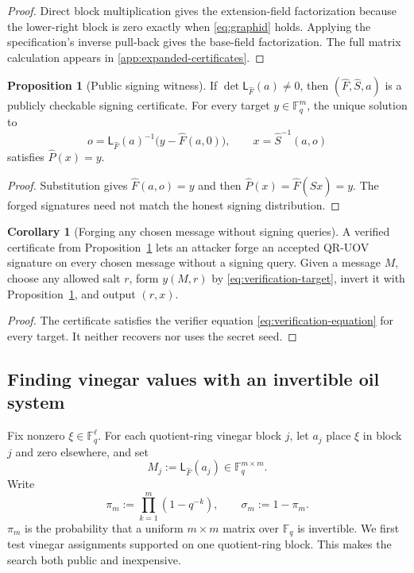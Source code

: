 \documentclass[11pt,a4paper]{article}
\theoremstyle{definition}
\newtheorem{proposition}[theorem]{Proposition}
\newtheorem{corollary}[theorem]{Corollary}
\theoremstyle{remark}
\newcommand{\F}{\mathbb F}
\newcommand{\QRUOV}{\textsf{QR-UOV}}
\begin{document}
\begin{proof}
Direct block multiplication gives the extension-field factorization because
the lower-right block is zero exactly when \eqref{eq:graphid} holds.  Applying
the specification's inverse pull-back gives the base-field factorization.  The
full matrix calculation appears in \cref{app:expanded-certificates}.
\end{proof}

\begin{proposition}[Public signing witness]\label{prop:signing-witness}
If $\det\mathsf L_{\widehat F}(a)\ne0$, then
$(\widehat F,\widehat S,a)$ is a publicly checkable signing certificate.  For
every target $y\in\F_q^m$, the unique solution to
\begin{equation}\label{eq:universal-inversion}
 o=\mathsf L_{\widehat F}(a)^{-1}\bigl(y-\widehat F(a,0)\bigr),
 \qquad
 x=\widehat S^{-1}(a,o)
\end{equation}
satisfies $\widehat P(x)=y$.
\end{proposition}

\begin{proof}
Substitution gives $\widehat F(a,o)=y$ and then
$\widehat P(x)=\widehat F(\widehat Sx)=y$.  The forged signatures need not
match the honest signing distribution.
\end{proof}

\begin{corollary}[Forging any chosen message without signing queries]\label{cor:universal-forgery}
A verified certificate from Proposition~\ref{prop:signing-witness} lets an attacker forge
an accepted \QRUOV{} signature on every chosen message without a signing
query.  Given a message $M$, choose any allowed salt $r$, form $y(M,r)$ by
\eqref{eq:verification-target}, invert it with
Proposition~\ref{prop:signing-witness}, and output $(r,x)$.
\end{corollary}

\begin{proof}
The certificate satisfies the verifier equation
\eqref{eq:verification-equation} for every target.  It neither recovers nor
uses the secret seed.
\end{proof}

\subsection{Finding vinegar values with an invertible oil system}

Fix nonzero $\xi\in\F_q^\ell$.  For each quotient-ring vinegar block $j$, let
$a_j$ place $\xi$ in block $j$ and zero elsewhere, and set
\[
 M_j:=\mathsf L_{\widehat F}(a_j)\in\F_q^{m\times m}.
\]
Write
\[
 \pi_m:=\prod_{k=1}^m(1-q^{-k}),
 \qquad \sigma_m:=1-\pi_m.
\]
$\pi_m$ is the probability that a uniform $m\times m$ matrix over $\F_q$ is
invertible.  We first test vinegar assignments supported on one quotient-ring
block.  This makes the search both public and inexpensive.
\end{document}

